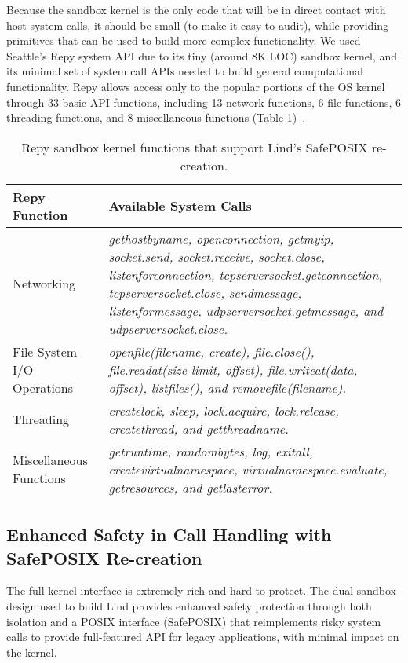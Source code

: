 Because the sandbox kernel is the only code that will be in direct contact with host
system calls, it should be small (to make it easy to audit), while providing
primitives that can be used to build more complex functionality.
We used Seattle's Repy system API due to its tiny (around 8K LOC) sandbox
kernel, and its minimal set of system call APIs needed to build general
computational functionality. Repy allows access only to the popular portions of
the OS kernel through 33 basic API functions, including 13 network functions, 6
file functions, 6 threading functions, and 8 miscellaneous functions (Table
\ref{table:RepyKernel})~\cite{Repy-10, RepyKernel}.

\begin{table}
\centering
  \begin{tabular}{ | p{2.5cm} | p{4.5cm} |}
  \hline
  \textbf{Repy Function} & \textbf{Available System Calls}  \\ \hline

Networking & \emph{gethostbyname, openconnection, getmyip, socket.send, socket.receive, socket.close,
listenforconnection, tcpserversocket.getconnection, tcpserversocket.close, sendmessage, listenformessage,
udpserversocket.getmessage, and udpserversocket.close.} \\ \hline

File System I/O Operations & \emph{openfile(filename, create), file.close(), file.readat(size limit, offset), file.writeat(data, offset),
listfiles(), and removefile(filename).} \\ \hline

Threading & \emph{createlock, sleep, lock.acquire, lock.release, createthread, and getthreadname.} \\ \hline

Miscellaneous Functions & \emph{getruntime, randombytes, log, exitall, createvirtualnamespace,
virtualnamespace.evaluate, getresources, and getlasterror.}  \\ \hline
    \end{tabular}
    \caption{Repy sandbox kernel functions that support Lind's SafePOSIX re-creation.}
    \label{table:RepyKernel}
\end{table}


\subsection{Enhanced Safety in Call Handling with SafePOSIX Re-creation}

The full kernel interface is extremely rich and hard to protect.
The dual sandbox \lip design used to build Lind provides enhanced
safety protection through both isolation and a POSIX interface (SafePOSIX) that
reimplements risky system calls to
provide full-featured API for legacy applications, with minimal impact on the kernel.

